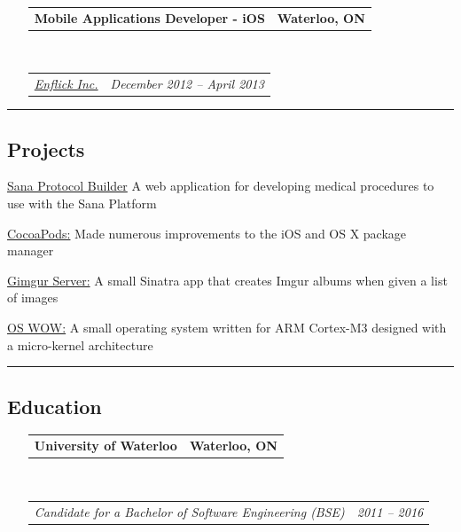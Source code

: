 \documentclass[10pt,letterpaper]{article}
\makeatletter
\newenvironment{indentsection}[1]%
{\begin{list}{}%
	{\setlength{\leftmargin}{#1}}%
	\item[]%
}
{\end{list}}
\newcommand{\headerrow}[2]
{\begin{tabular*}{\linewidth}{l@{\extracolsep{\fill}}r}
	#1 &
	#2 \\
\end{tabular*}}
\makeatother
\begin{document}
\begin{itemize}[leftmargin=*]
	\item[]
	\headerrow
		{\textbf{Mobile Applications Developer - iOS}}
		{\textbf{Waterloo, ON}}
	\\
	\headerrow
		{\emph{\href{https://www.enflick.com}{Enflick Inc.}}}
		{\emph{December 2012 -- April 2013}}
\end{itemize}

\hrule
\vspace{-0.4em}
\subsection*{Projects}
	\begin{indentsection}{\parindent}
	\begin{description*}
	    \item[\href{https://github.com/SanaMobile/sana.protocol_builder}{Sana Protocol Builder}] A web application for developing medical procedures to use with the Sana Platform
	    \item[\href{https://github.com/CocoaPods}{CocoaPods:}] Made numerous improvements to the iOS and OS X package manager
		\item[\href{https://github.com/Kapin/gimgur-server}{Gimgur Server:}] A small Sinatra app that creates Imgur albums when given a list of images
		\item[\href{https://github.com/Trinovantes/se350-project}{OS WOW:}] A small operating system written for ARM Cortex-M3 designed with a micro-kernel architecture
	\end{description*}
	\end{indentsection}

\hrule
\vspace{-0.4em}
\subsection*{Education}

\begin{itemize}[leftmargin=*]
	\parskip=0.1em

	\item[] 
	\headerrow
		{\textbf{University of Waterloo}}
		{\textbf{Waterloo, ON}}
	\\
	\headerrow
		{\emph{Candidate for a Bachelor of Software Engineering (BSE)}}
		{\emph{2011 -- 2016}}

\end{itemize}
\end{document}
